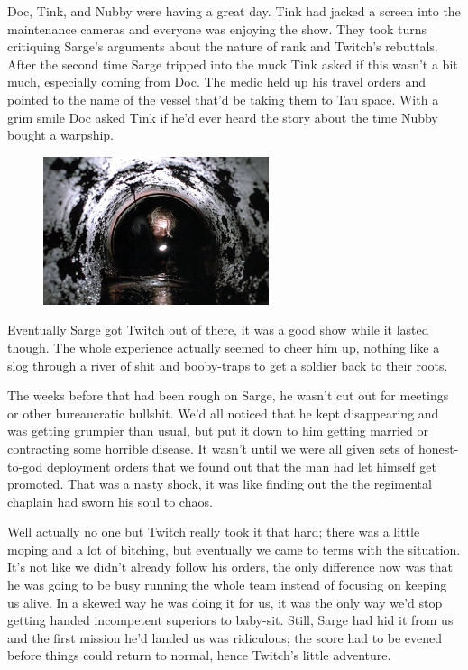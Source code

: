 Doc, Tink, and Nubby were having a great day. 
Tink had jacked a screen into the maintenance cameras and everyone was enjoying the show. 
They took turns critiquing Sarge's arguments about the nature of rank and Twitch's rebuttals. 
After the second time Sarge tripped into the muck Tink asked if this wasn't a bit much, especially coming from Doc. 
The medic held up his travel orders and pointed to the name of the vessel that'd be taking them to Tau space. 
With a grim smile Doc asked Tink if he'd ever heard the story about the time Nubby bought a warpship.



\begin{figure}
	\begin{center}
		\includegraphics[width=\figwidth]{pics/10/2.png}
	\end{center}
\end{figure}
Eventually Sarge got Twitch out of there, it was a good show while it lasted though. 
The whole experience actually seemed to cheer him up, nothing like a slog through a river of shit and booby-traps to get a soldier back to their roots. 


The weeks before that had been rough on Sarge, he wasn't cut out for meetings or other bureaucratic bullshit. 
We'd all noticed that he kept disappearing and was getting grumpier than usual, but put it down to him getting married or contracting some horrible disease. 
It wasn't until we were all given sets of honest-to-god deployment orders that we found out that the man had let himself get promoted. 
That was a nasty shock, it was like finding out the the regimental chaplain had sworn his soul to chaos.

Well actually no one but Twitch really took it that hard; 
there was a little moping and a lot of bitching, but eventually we came to terms with the situation. 
It's not like we didn't already follow his orders, the only difference now was that he was going to be busy running the whole team instead of focusing on keeping us alive. 
In a skewed way he was doing it for us, it was the only way we'd stop getting handed incompetent superiors to baby-sit. 
Still, Sarge had hid it from us and the first mission he'd landed us was ridiculous; 
the score had to be evened before things could return to normal, hence Twitch's little adventure.


